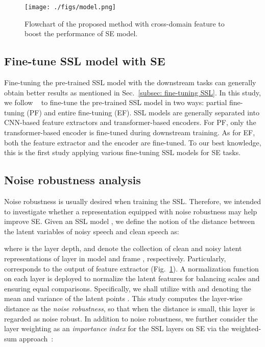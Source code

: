 \documentclass[a4paper]{article}
\begin{document}
\begin{figure}[t]
  \centering
  \texttt{[image: ./figs/model.png]}
  \caption{Flowchart of the proposed method with cross-domain feature to boost the performance of SE model.}
  \label{fig:model}
\end{figure}

\subsection{Fine-tune SSL model with SE}\label{subsec:Finetune SSL model}
Fine-tuning the pre-trained SSL model with the downstream tasks can generally obtain better results as mentioned in Sec.~\ref{subsec: fine-tuning SSL}. In this study, we follow ~\cite{wang2021fine} to fine-tune the pre-trained SSL model in two ways: partial fine-tuning (PF) and entire fine-tuning (EF). SSL models are generally separated into CNN-based feature extractors and transformer-based encoders. For PF, only the transformer-based encoder is fine-tuned during downstream training. As for EF, both the feature extractor and the encoder are fine-tuned. To our best knowledge, this is the first study applying various fine-tuning SSL models for SE tasks.

\subsection{Noise robustness analysis}\label{subsec:Noise robustness analysis}
Noise robustness is usually desired when training the SSL. Therefore, we intended to investigate whether a representation equipped with noise robustness may help improve SE. Given an SSL model , we define the notion of the distance between the latent variables of noisy speech and clean speech as:

where  is the layer depth,  and  denote the collection of clean and noisy latent representations of layer  in model  and frame , respectively. Particularly,  corresponds to the output of feature extractor (Fig.~\ref{fig:model}). A normalization function  on each layer  is deployed to normalize the latent features  for balancing scales and ensuring equal comparisons. Specifically, we shall utilize  with  and  denoting the mean and variance of the latent points . This study computes the layer-wise distance  as the \emph{noise robustness}, so that when the distance  is small, this layer  is regarded as noise robust. In addition to noise robustness, we further consider the layer weighting as an \textit{importance index} for the SSL layers on SE via the weighted-sum approach~\cite{yang2021superb}:
\end{document}
